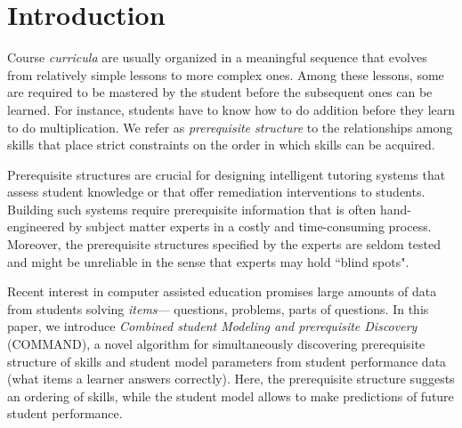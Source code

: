 \documentclass{edm_template}
\begin{document}
%


\section{Introduction}
\label{sec:introduction}
Course \textit{curricula} are usually organized in a meaningful sequence  that evolves from relatively simple lessons to more complex ones. 
Among these lessons, some are required to be mastered by the student  before the subsequent ones can be learned.
For instance, students have to know how to do addition before they learn to do multiplication.
We refer as \textit{prerequisite structure} to the relationships among skills that place strict constraints on the order in which  skills can be acquired. 

Prerequisite structures are crucial for designing intelligent tutoring systems that assess student knowledge or that offer remediation interventions to students.
Building such systems require prerequisite information that is often hand-engineered by subject matter experts in a costly and time-consuming process. 
Moreover, the prerequisite structures specified by the experts are seldom tested and might be unreliable in the sense that experts may hold ``blind spots".


Recent interest in computer assisted education promises large amounts of data from students solving \textit{items}--- questions, problems, parts of questions.
In this paper, we introduce \emph{Combined student Modeling and prerequisite Discovery} (COMMAND), 
a novel algorithm for simultaneously discovering prerequisite structure of skills and student model parameters from student performance data
(what items a learner answers correctly).
Here,  the prerequisite structure suggests an ordering of skills, while the student model allows to make predictions of future student performance.
\end{document}
